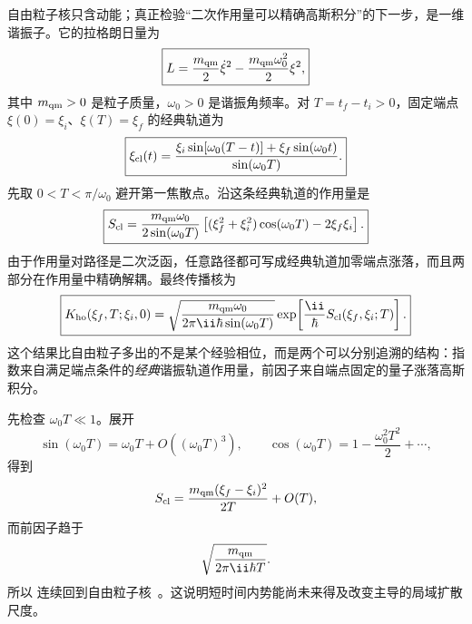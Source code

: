 
\begin{exbox}[谐振子传播核]
自由粒子核只含动能；真正检验“二次作用量可以精确高斯积分”的下一步，是一维谐振子。它的拉格朗日量为
\begin{equation}
 \boxed{L=\frac{m_{\rm qm}}2\dot\xi^2
 -\frac{m_{\rm qm}\omega_0^2}{2}\xi^2,}
 \label{eq:harmonic-lagrangian-dp68}
\end{equation}
其中 $m_{\rm qm}>0$ 是粒子质量，$\omega_0>0$ 是谐振角频率。对 $T=t_f-t_i>0$，固定端点 $\xi(0)=\xi_i$、$\xi(T)=\xi_f$ 的经典轨道为
\begin{equation}
 \boxed{
 \xi_{\rm cl}(t)
 =\frac{\xi_i\sin[\omega_0(T-t)]
 +\xi_f\sin(\omega_0t)}{\sin(\omega_0T)}.}
 \label{eq:harmonic-classical-path-dp64}
\end{equation}
先取 $0<T<\pi/\omega_0$ 避开第一焦散点。沿这条经典轨道的作用量是
\begin{equation}
 \boxed{
 S_{\rm cl}
 =\frac{m_{\rm qm}\omega_0}{2\sin(\omega_0T)}
 \left[
 (\xi_f^2+\xi_i^2)\cos(\omega_0T)-2\xi_f\xi_i
 \right].}
 \label{eq:harmonic-classical-action-dp64}
\end{equation}
由于作用量对路径是二次泛函，任意路径都可写成经典轨道加零端点涨落，而且两部分在作用量中精确解耦。最终传播核为
\begin{equation}
 \boxed{
 K_{\rm ho}(\xi_f,T;\xi_i,0)
 =\sqrt{\frac{m_{\rm qm}\omega_0}
 {2\pi\ii\hbar\sin(\omega_0T)}}
 \exp\!\left[\frac{\ii}{\hbar}S_{\rm cl}(\xi_f,\xi_i;T)\right].}
 \label{eq:harmonic-kernel-dp64}
\end{equation}
这个结果比自由粒子多出的不是某个经验相位，而是两个可以分别追溯的结构：指数来自满足端点条件的\emph{经典}谐振轨道作用量，前因子来自端点固定的量子涨落高斯积分。

先检查 $\omega_0T\ll1$。展开
\begin{equation*}
 \sin(\omega_0T)=\omega_0T+O((\omega_0T)^3),
 \qquad
 \cos(\omega_0T)=1-\frac{\omega_0^2T^2}{2}+\cdots,
\end{equation*}
得到
\begin{equation*}
 S_{\rm cl}
 =\frac{m_{\rm qm}(\xi_f-\xi_i)^2}{2T}
 +O(T),
\end{equation*}
而前因子趋于
\begin{equation*}
 \sqrt{\frac{m_{\rm qm}}{2\pi\ii\hbar T}}.
\end{equation*}
所以 连续回到自由粒子核~。这说明短时间内势能尚未来得及改变主导的局域扩散尺度。


\end{exbox}
